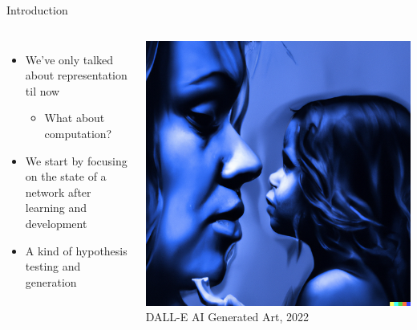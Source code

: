 \documentclass[handout,aspectratio=169]{beamer}
\begin{document}
	\begin{frame}{Introduction}
    \begin{columns}[c]
        \begin{itemize}
          \setlength\itemsep{0.5cm}
          \item We've only talked about representation til now
          \begin{itemize}
            \setlength\itemsep{0.25cm}
            \item What about computation?
          \end{itemize}
          \item We start by focusing on the state of a network after learning and development
          \item A kind of hypothesis testing and generation 
        \end{itemize}
        \includegraphics[width=\textwidth]{media/dalle_child_adult.png}
        \raggedleft\small DALL-E AI Generated Art, 2022
    \end{columns}
	\end{frame}
\end{document}
